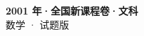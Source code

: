 \documentclass[zihao=-4, a4paper]{ctexart}
\begin{document}
\begin{center}
  {\Large\bfseries 2001 年·全国新课程卷·文科}\\[4pt]
  {\large 数学 · 试题版}
\end{center}
\medskip
{}

\end{document}
